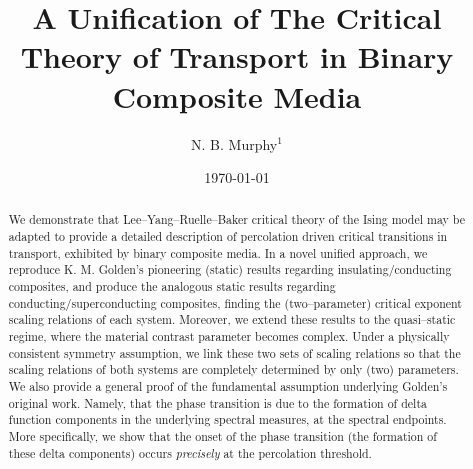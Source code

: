 \documentclass[english,12pt,jmp,graphicx]{revtex4-1}
\begin{document}

\title{A Unification of The Critical Theory of Transport in Binary
  Composite Media} %



\author{N. B. Murphy$^1$}
%


\date{\today}

\begin{abstract}
%
We demonstrate that Lee--Yang--Ruelle--Baker critical theory of the
Ising model may be adapted to provide a detailed description of
percolation driven critical transitions in transport, exhibited by
binary composite media. In a novel unified approach, we reproduce
K. M. Golden's pioneering (static) results regarding insulating/conducting
composites, and produce the analogous static results regarding
conducting/superconducting composites, finding the (two--parameter)
critical exponent scaling relations of each system. Moreover, we
extend these results to the quasi--static regime, where the material
contrast parameter becomes complex. Under a physically consistent
symmetry assumption, we link these two sets of scaling relations so
that the scaling relations of both systems are completely determined
by only (two) parameters. We also provide a general proof of the
fundamental assumption underlying Golden's original work. Namely, that
the phase transition is due to the formation of delta function
components in the underlying spectral measures, at the spectral
endpoints. More specifically, we show that the onset of the phase
transition (the formation of these delta components) occurs
\emph{precisely} at the percolation threshold.      

%
\end{abstract}
\end{document}
